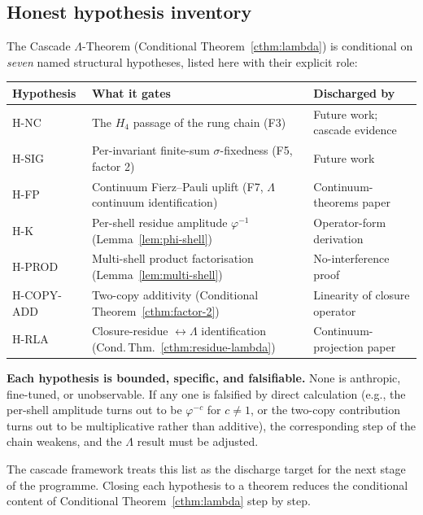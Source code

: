 \documentclass[11pt]{article}
\theoremstyle{plain}
\theoremstyle{definition}
\theoremstyle{remark}
\begin{document}
\subsection{Honest hypothesis inventory}\label{sec:lambda-honest}

The Cascade $\Lambda$-Theorem (Conditional Theorem~\ref{cthm:lambda}) is conditional on \emph{seven} named structural hypotheses, listed here with their explicit role:

\begin{center}
\renewcommand{\arraystretch}{1.2}
\begin{tabular}{lp{5.5cm}l}
\toprule
\textbf{Hypothesis} & \textbf{What it gates} & \textbf{Discharged by} \\
\midrule
H-NC & The $H_4$ passage of the rung chain (F3) & Future work; cascade evidence \\
H-SIG & Per-invariant finite-sum $\sigma$-fixedness (F5, factor 2) & Future work \\
H-FP & Continuum Fierz--Pauli uplift (F7, $\Lambda$ continuum identification) & Continuum-theorems paper \\
H-K & Per-shell residue amplitude $\varphi^{-1}$ (Lemma~\ref{lem:phi-shell}) & Operator-form derivation \\
H-PROD & Multi-shell product factorisation (Lemma~\ref{lem:multi-shell}) & No-interference proof \\
H-COPY-ADD & Two-copy additivity (Conditional Theorem~\ref{cthm:factor-2}) & Linearity of closure operator \\
H-RLA & Closure-residue $\leftrightarrow \Lambda$ identification (Cond.\,Thm.~\ref{cthm:residue-lambda}) & Continuum-projection paper \\
\bottomrule
\end{tabular}
\end{center}

\textbf{Each hypothesis is bounded, specific, and falsifiable.} None is anthropic, fine-tuned, or unobservable. If any one is falsified by direct calculation (e.g., the per-shell amplitude turns out to be $\varphi^{-c}$ for $c \neq 1$, or the two-copy contribution turns out to be multiplicative rather than additive), the corresponding step of the chain weakens, and the $\Lambda$ result must be adjusted.

The cascade framework treats this list as the discharge target for the next stage of the programme. Closing each hypothesis to a theorem reduces the conditional content of Conditional Theorem~\ref{cthm:lambda} step by step.
\end{document}
